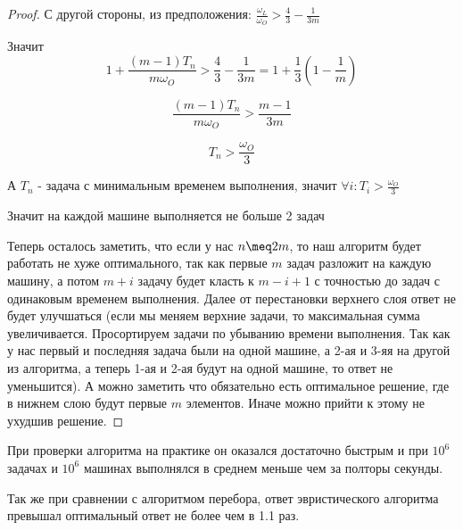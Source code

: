 \documentclass{article}
\begin{document}
\begin{proof}
С другой стороны, из предположения: $\frac{\omega_L}{\omega_O} > \frac{4}{3} - \frac{1}{3m}$

Значит $$1 + \frac{(m - 1)T_n}{m\omega_O} > \frac{4}{3} - \frac{1}{3m} = 1 + \frac{1}{3}(1 - \frac{1}{m})$$

$$\frac{(m - 1)T_n}{m\omega_O} > \frac{m - 1}{3m}$$

$$T_n > \frac{\omega_O}{3}$$

А $T_n$ - задача с минимальным временем выполнения, значит $\forall{i} : T_i > \frac{\omega_O}{3}$

Значит на каждой машине выполняется не больше 2 задач

Теперь осталось заметить, что если у нас $n \meq 2m$, то наш алгоритм будет работать не хуже оптимального, так как первые $m$ задач разложит на каждую машину, а потом $m + i$ задачу будет класть к $m - i + 1$ с точностью до задач с одинаковым временем выполнения. Далее от перестановки верхнего слоя ответ не будет улучшаться (если мы меняем верхние задачи, то максимальная сумма увеличивается. Просортируем задачи по убыванию времени выполнения. Так как у нас первый и последняя задача были на одной машине, а 2-ая и 3-яя на другой из алгоритма, а теперь 1-ая и 2-ая будут на одной машине, то ответ не уменьшится). А можно заметить что обязательно есть оптимальное решение, где в нижнем слою будут первые $m$ элементов. Иначе можно прийти к этому не ухудшив решение.

\end{proof}

При проверки алгоритма на практике он оказался достаточно быстрым и при $10^6$ задачах и $10^6$ машинах выполнялся в среднем меньше чем за полторы секунды.

Так же при сравнении с алгоритмом перебора, ответ эвристического алгоритма превышал оптимальный ответ не более чем в 1.1 раз.

\renewcommand{\refname}{Библиография}


\end{document}
